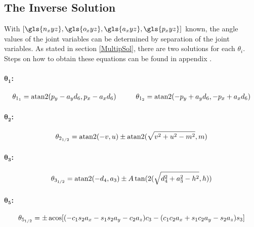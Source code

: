 \subsection{The Inverse Solution} \label{InverseSol}
With $[\gls{n_xyz},\gls{o_xyz},\gls{a_xyz},\gls{p_xyz}]$ known, the angle values of the joint variables can be determined by separation of the joint variables. 
As stated in section \ref{MultipSol}, there are two solutions for each $\theta_i$. Steps on how to obtain these equations can be found in appendix .
\medskip


\paragraph{$\pmb{\theta_1}$:}


\begin{multline}\label{eq:sol_theta_1}
	\theta_{1_1} = \operatorname{atan2} ( p_y - a_y d_6 , p_x - a_x d_6) 
	\phantom{..........}
	\theta_{1_2} = \operatorname{atan2} (-p_y + a_y d_6 ,-p_x + a_x d_6) 
\end{multline}
\medskip

\paragraph{$\pmb{\theta_2}$:}


\begin{equation}\label{eq:sol_theta_2}
	\theta_{2_{1/2}} = \operatorname{atan2} (-v , u)\pm \operatorname{atan2}(\sqrt{v^2 +u^2 - m^2 } , m)
\end{equation}



\paragraph{$\pmb{\theta_3}$:}


\begin{equation}\label{eq:sol_theta_3}
	\theta_{3_{1/2}} = \operatorname{atan2}(-d_4 , a_3) \pm A \tan (2 (\sqrt{d_4^2 +a_3^2 -h^2} , h))
\end{equation}


\paragraph{$\pmb{\theta_5}$:}



\begin{equation}\label{eq:sol_theta_5}
	\theta_{5_{1/2}} = \pm \operatorname{acos} [ ( -c_1 s_2 a_x - s_1 s_2 a_y - c_2 a_z) c_3 - (c_1 c_2 a_x + s_1 c_2 a_y - s_2 a_z) s_3]
\end{equation}

